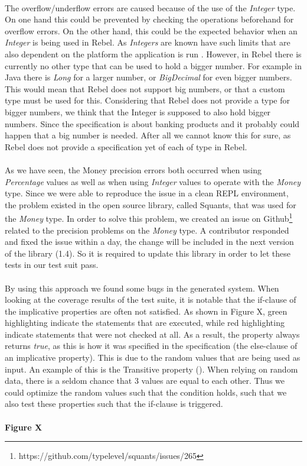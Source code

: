 \\
The overflow/underflow errors are caused because of the use of the \textit{Integer} type. On one hand this could be prevented by checking the operations beforehand for overflow errors. On the other hand, this could be the expected behavior when an \textit{Integer} is being used in Rebel. As \textit{Integers} are known have such limits that are also dependent on the platform the application is run . However, in Rebel there is currently no other type that can be used to hold a bigger number. For example in Java there is \textit{Long} for a larger number, or \textit{BigDecimal} for even bigger numbers. This would mean that Rebel does not support big numbers, or that a custom type must be used for this. Considering that Rebel does not provide a type for bigger numbers, we think that the Integer is supposed to also hold bigger numbers. Since the specification is about banking products and it probably could happen that a big number is needed. After all we cannot know this for sure, as Rebel does not provide a specification yet of each of type in Rebel.\\
\\
As we have seen, the Money precision errors both occurred when using \textit{Percentage} values as well as when using \textit{Integer} values to operate with the \textit{Money} type. Since we were able to reproduce the issue in a clean REPL environment, the problem existed in the open source library, called Squants, that was used for the \textit{Money} type. In order to solve this problem, we created an issue on Github\footnote{https://github.com/typelevel/squants/issues/265} related to the precision problems on the \textit{Money} type. A contributor responded and fixed the issue within a day, the change will be included in the next version of the library (1.4). So it is required to update this library in order to let these tests in our test suit pass.\\
\\ 
By using this approach we found some bugs in the generated system. When looking at the coverage results of the test suite, it is notable that the if-clause of the implicative properties are often not satisfied. As shown in Figure X, green highlighting indicate the statements that are executed, while red highlighting indicate statements that were not checked at all. As a result, the property always returns \textit{true}, as this is how it was specified in the specification (the else-clause of an implicative property). This is due to the random values that are being used as input. An example of this is the Transitive property (). When relying on random data, there is a seldom chance that 3 values are equal to each other. Thus we could optimize the random values such that the condition holds, such that we also test these properties such that the if-clause is triggered.\\
\\
\textbf{Figure X}

